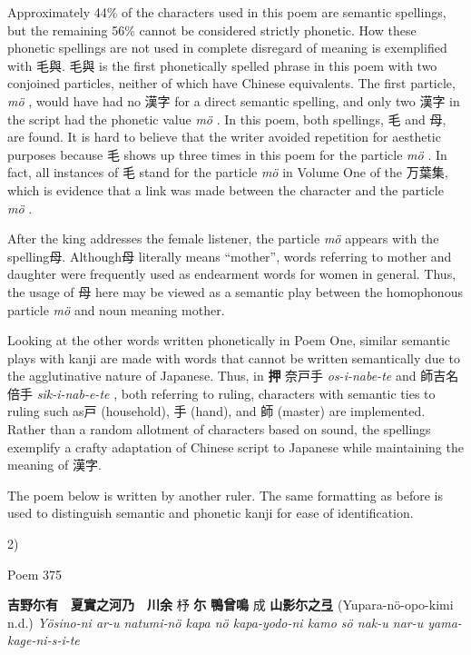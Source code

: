 \par{ Approximately 44\% of the characters used in this poem are semantic spellings, but the remaining 56\% cannot be considered strictly phonetic. How these phonetic spellings are not used in complete disregard of meaning is exemplified with 毛與. 毛與 is the first phonetically spelled phrase in this poem with two conjoined particles, neither of which have Chinese equivalents. The first particle, \emph{mö }, would have had no 漢字 for a direct semantic spelling, and only two 漢字 in the script had the phonetic value \emph{mö }. In this poem, both spellings, 毛 and 母, are found. It is hard to believe that the writer avoided repetition for aesthetic purposes because 毛 shows up three times in this poem for the particle \emph{mö }. In fact, all instances of 毛 stand for the particle \emph{mö }in Volume One of the 万葉集, which is evidence that a link was made between the character and the particle \emph{mö }. }

\par{ After the king addresses the female listener, the particle \emph{mö }appears with the spelling母. Although母 literally means “mother”, words referring to mother and daughter were frequently used as endearment words for women in general. Thus, the usage of 母 here may be viewed as a semantic play between the homophonous particle \emph{mö }and noun meaning mother. }

\par{ Looking at the other words written phonetically in Poem One, similar semantic plays with kanji are made with words that cannot be written semantically due to the agglutinative nature of Japanese. Thus, in \textbf{押 }奈戸手  \emph{os-i-nabe-te }and 師吉名倍手 \emph{sik-i-nab-e-te }, both referring to ruling, characters with semantic ties to ruling such as戸 (household), 手 (hand), and 師 (master) are implemented. Rather than a random allotment of characters based on sound, the spellings exemplify a crafty adaptation of Chinese script to Japanese while maintaining the meaning of 漢字. }

\par{ The poem below is written by another ruler. The same formatting as before is used to distinguish semantic and phonetic kanji for ease of identification. }

\par{2) }

\par{Poem 375 }

\par{\textbf{吉野尓有　夏實之河乃　川余 }杼 \textbf{尓 } \textbf{鴨曾鳴 }成 \textbf{山影尓之弖 }(Yupara-nö-opo-kimi n.d.) \hfill\break
\emph{Yösino-ni ar-u natumi-nö kapa nö kapa-yodo-ni kamo sö nak-u nar-u yama-kage-ni-s-i-te }}


